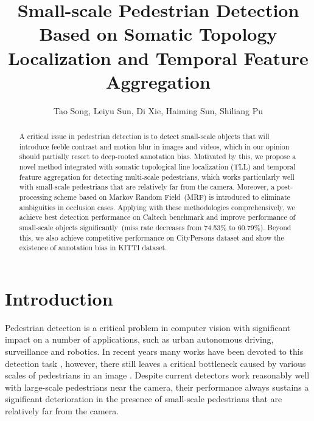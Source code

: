 \documentclass[runningheads]{llncs}
\begin{document}
\pagestyle{headings}
\mainmatter
\def\ECCV18SubNumber{}  

\title{Small-scale Pedestrian Detection Based on Somatic Topology Localization and Temporal Feature Aggregation} 


\authorrunning{}

\author{Tao Song, Leiyu Sun, Di Xie, Haiming Sun, Shiliang Pu}


\maketitle

\begin{abstract}
A critical issue in pedestrian detection is to detect small-scale objects that will introduce feeble contrast and motion blur in images and videos, which in our opinion should partially resort to deep-rooted annotation bias. Motivated by this, we propose a novel method integrated with somatic topological line localization (TLL) and temporal feature aggregation for detecting multi-scale pedestrians, which works particularly well with small-scale pedestrians that are relatively far from the camera. Moreover, a post-processing scheme based on Markov Random Field~(MRF) is introduced to eliminate ambiguities in occlusion cases. Applying with these methodologies comprehensively, we achieve best detection performance on Caltech benchmark and improve performance of small-scale objects significantly~(miss rate decreases from 74.53\% to 60.79\%). Beyond this, we also achieve competitive performance on CityPersons dataset and show the existence of annotation bias in KITTI dataset.
\end{abstract}


\section{Introduction}
Pedestrian detection is a critical problem in computer vision with significant impact on a number of applications, such as urban autonomous driving, surveillance and robotics. In recent years many works have been devoted to this detection task \cite{PDSummary,FeaPyramid,FRCNNPD}, however, there still leaves a critical bottleneck caused by various scales of pedestrians in an image \cite{SAFRCNN,MSCNN}. Despite current detectors work reasonably well with large-scale pedestrians near the camera, their performance always sustains a significant deterioration in the presence of small-scale pedestrians that are relatively far from the camera.
\end{document}
